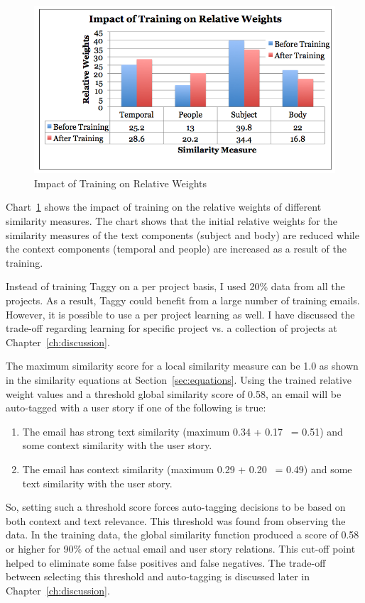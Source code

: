 \begin{figure}[htb]
	\centering
	\includegraphics[width=\textwidth]{training.png}
    \caption{Impact of Training on Relative Weights}
	\label{fig:training}
\end{figure}

Chart~\ref{fig:training} shows the impact of training on the relative weights of different similarity measures. The chart shows that the initial relative weights for the similarity measures of the text components (subject and body) are reduced while the context components (temporal and people) are increased as a result of the training.

Instead of training Taggy on a per project basis, I used 20\% data from all the projects. As a result, Taggy could benefit from a large number of training emails. However, it is possible to use a per project learning as well. I have discussed the trade-off regarding learning for specific project vs. a collection of projects at Chapter~\ref{ch:discussion}.

The maximum similarity score for a local similarity measure can be 1.0 as shown in the similarity equations at Section~\ref{sec:equations}. Using the trained relative weight values and a threshold global similarity score of 0.58, an email will be auto-tagged with a user story if one of the following is true:
\begin{enumerate}
	\item The email has strong text similarity (maximum 0.34 + 0.17 ~= 0.51) and some context similarity with the user story.
	\item The email has context similarity (maximum 0.29 + 0.20 ~= 0.49) and some text similarity with the user story.
\end{enumerate}
So, setting such a threshold score forces auto-tagging decisions to be based on both context and text relevance. This threshold was found from observing the data. In the training data, the global similarity function produced a score of 0.58 or higher for 90\% of the actual email and user story relations. This cut-off point helped to eliminate some false positives and false negatives. The trade-off between selecting this threshold and auto-tagging is discussed later in Chapter~\ref{ch:discussion}.  

